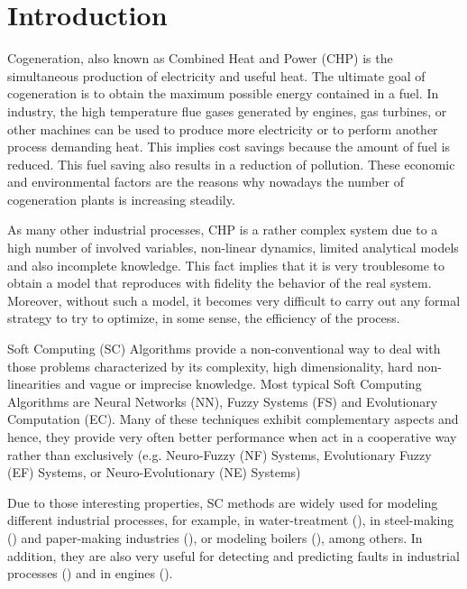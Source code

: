 \section{Introduction}
\label{intro}

Cogeneration, also known as Combined Heat and Power (CHP) is the simultaneous production of electricity and useful heat. The ultimate goal of cogeneration is to obtain the maximum possible energy contained in a fuel. In industry, the high temperature flue gases generated by engines, gas turbines, or other machines can be used to produce more electricity or to perform another process demanding heat. This implies cost savings because the amount of fuel is reduced. This fuel saving also results in a reduction of pollution. These economic and environmental factors are the reasons why nowadays the number of cogeneration plants is increasing steadily. 

 As many other industrial processes, CHP is a rather complex system due to a high number of involved variables, non-linear dynamics, limited analytical models and also incomplete knowledge. This fact implies that it is very troublesome to obtain a model that reproduces with fidelity the behavior of the real system. Moreover, without such a model, it becomes very difficult to carry out any formal strategy to try to optimize, in some sense, the efficiency of the process.

Soft Computing (SC) Algorithms provide a non-conventional way to deal with those problems characterized by its complexity, high dimensionality, hard non-linearities and vague or imprecise knowledge. Most typical Soft Computing Algorithms are Neural Networks (NN), Fuzzy Systems (FS) and Evolutionary Computation (EC). Many of these techniques exhibit complementary  aspects and hence, they provide very often better performance when act in a cooperative way rather than exclusively (e.g. Neuro-Fuzzy (NF) Systems, Evolutionary Fuzzy (EF) Systems, or Neuro-Evolutionary (NE) Systems)

Due to those interesting properties, SC methods are widely used for modeling different industrial processes, for example, in water-treatment (\cite{Noshadi-2013}), in steel-making (\cite{Isazadeh-2012}) and paper-making industries (\cite{Zhang-2012}), or modeling boilers (\cite{Budnik-2012,Huang-2009}), among others. In addition, they are also very useful for detecting and predicting faults in industrial processes (\cite{Rakhshani-2009,Lemma-2013}) and in engines (\cite{Shatnawi-2014,Ghate-2011,Refaat-2013}). 


